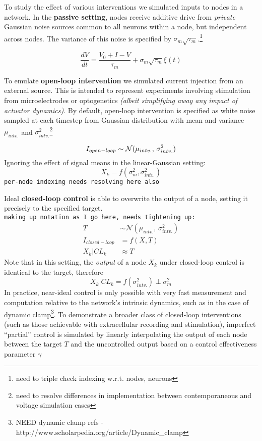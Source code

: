 To study the effect of various interventions we simulated inputs to
nodes in a network. In the \textbf{passive setting}, nodes receive
additive drive from \emph{private} Gaussian noise sources common to all
neurons within a node, but independent across nodes. The variance of
this noise is specified by \(\sigma_m \sqrt{\tau_m}\).\footnote{need to
  triple check indexing w.r.t. nodes, neurons}

\[
\frac{dV}{dt} = \frac{V_0 + I - V}{\tau_m} + \sigma_m \sqrt{\tau_m} \xi(t)
\]

To emulate \textbf{open-loop intervention} we simulated current
injection from an external source. This is intended to represent
experiments involving stimulation from microelectrodes or optogenetics
\emph{(albeit simplifying away any impact of actuator dynamics)}. By
default, open-loop intervention is specified as white noise sampled at
each timestep from Gaussian distribution with mean and variance
\(\mu_{intv.}\) and \(\sigma^2_{intv.}\)\footnote{need to resolve
  differences in implementation between contemporaneous and voltage
  simulation cases}

\[ I_{open-loop} \sim \mathcal{N}(\mu_{intv.},\,\sigma^{2}_{intv.})\\
\] Ignoring the effect of signal means in the linear-Gaussian setting:
\[ X_k = f(\sigma^2_m, \sigma^{2}_{intv.})
\] \texttt{per-node\ indexing\ needs\ resolving\ here\ also}

Ideal \textbf{closed-loop control} is able to overwrite the output of a
node, setting it precisely to the specified target.
\texttt{making\ up\ notation\ as\ I\ go\ here,\ needs\ tightening\ up:}
\[
\begin{aligned} T &\sim \mathcal{N}(\mu_{intv.},\,\sigma^{2}_{intv.}) \\ I_{closed-loop} &= f(X, T)  \\ X_k | CL_{k} &\approx T
\end{aligned}
\] Note that in this setting, the \emph{output} of a node \(X_k\) under
closed-loop control is identical to the target, therefore
\[ X_k | CL_{k} = f(\sigma^{2}_{intv.}) \perp \sigma^2_m
\] In practice, near-ideal control is only possible with very fast
measurement and computation relative to the network's intrinsic
dynamics, such as in the case of dynamic clamp\footnote{NEED dynamic
  clamp refs - http://www.scholarpedia.org/article/Dynamic\_clamp}. To
demonstrate a broader class of closed-loop interventions (such as those
achievable with extracellular recording and stimulation), imperfect
``partial'' control is simulated by linearly interpolating the output of
each node between the target \(T\) and the uncontrolled output based on
a control effectiveness parameter \(\gamma\)

